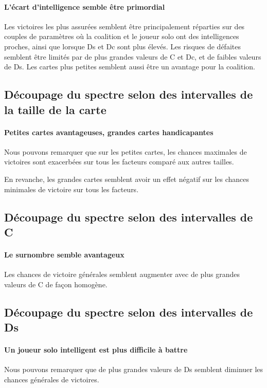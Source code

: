 \paragraph{L'écart d'intelligence semble être primordial}
Les victoires les plus assurées semblent être principalement réparties sur des couples de paramètres où la coalition et le joueur solo ont des intelligences proches, ainsi que lorsque Ds et Dc sont plus élevés.
Les risques de défaites semblent être limités par de plus grandes valeurs de C et Dc, et de faibles valeurs de Ds.
Les cartes plus petites semblent aussi être un avantage pour la coalition.


\subsection{Découpage du spectre selon des intervalles de la taille de la carte}
\paragraph{Petites cartes avantageuses, grandes cartes handicapantes}
Nous pouvons remarquer que sur les petites cartes, les chances maximales de victoires sont exacerbées sur tous les facteurs comparé aux autres tailles.

En revanche, les grandes cartes semblent avoir un effet négatif sur les chances minimales de victoire sur tous les facteurs. 

\subsection{Découpage du spectre selon des intervalles de C}
\paragraph{Le surnombre semble avantageux}
Les chances de victoire générales semblent augmenter avec de plus grandes valeurs de C de façon homogène.


\subsection{Découpage du spectre selon des intervalles de Ds}
\paragraph{Un joueur solo intelligent est plus difficile à battre}
Nous pouvons remarquer que de plus grandes valeurs de Ds semblent diminuer les chances générales de victoires.

